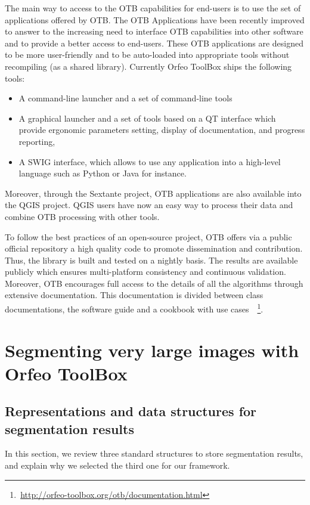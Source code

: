 \documentclass{josis}
\newcommand{\furl}[1]{    $\,$\footnote{$\,$\url{#1}}}
\begin{document}
The main way to access to the OTB capabilities for end-users is to use the set of applications offered by OTB. The OTB Applications have been recently improved to answer to the increasing need to interface OTB capabilities into other software and to provide a better access to end-users. These OTB applications are designed to be more user-friendly and to be auto-loaded into appropriate tools without recompiling (as a shared library). Currently Orfeo ToolBox ships the following tools:
\begin{itemize}
\item A command-line launcher and a set of command-line tools
\item A graphical launcher and a set of tools based on a QT interface which provide ergonomic parameters setting, display of documentation, and progress reporting,
\item A SWIG interface, which allows to use any application into a high-level language such as Python or Java for instance.
\end{itemize}
Moreover, through the Sextante project, OTB applications are also available into the QGIS project. QGIS users have now an easy way to process their data and combine OTB processing with other tools.

To follow the best practices of an open-source project, OTB offers via a public official repository a high quality code to promote dissemination and contribution. Thus, the library is built and tested on a nightly basis. The results are available publicly which ensures multi-platform consistency and continuous validation. Moreover, OTB encourages full access to the details of all the algorithms through extensive documentation. This documentation is divided between class documentations, the software guide and a cookbook with use cases~\furl{http://orfeo-toolbox.org/otb/documentation.html}.

\section{Segmenting very large images with Orfeo ToolBox}


\subsection{Representations and data structures for segmentation results}

In this section, we review three standard structures to store
segmentation results, and explain why we selected the third one for
our framework.
\end{document}
